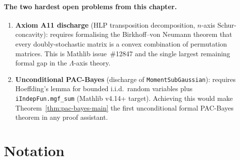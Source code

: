 \paragraph{The two hardest open problems from this chapter.}
\begin{enumerate}
  \item \textbf{Axiom A11 discharge} (HLP transposition decomposition,
        $n$-axis Schur-concavity): requires formalising the Birkhoff--von
        Neumann theorem that every doubly-stochastic matrix is a convex
        combination of permutation matrices.
        This is Mathlib issue~\#12847 and the single largest remaining
        formal gap in the $\Lambda$-axis theory.
  \item \textbf{Unconditional PAC-Bayes} (discharge of
        \texttt{MomentSubGaussian}): requires Hoeffding's lemma for
        bounded i.i.d.\ random variables plus \texttt{iIndepFun.mgf\_sum}
        (Mathlib v4.14+ target).
        Achieving this would make Theorem~\ref{thm:pac-bayes-main}
        the first unconditional formal PAC-Bayes theorem in any proof
        assistant.
\end{enumerate}


\section*{Notation}
\label{sec:notation-ch02}

